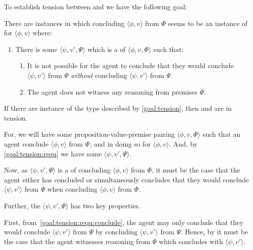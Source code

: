 \begin{note}[Goal]
  To establish tension between \ESU{} and \csN{} we have the following goal:

  \begin{goal}
    \label{goal:tension}
    There are instances in which concluding \(\langle \phi,v \rangle\) from \(\Phi\) seems to be an instance of \csN{} for \(\langle \phi,v \rangle\) where:
    \begin{enumerate}[label=\arabic*., ref=\named{G\ref{goal:tension}:\arabic*}]
    \item
      \label{goal:tension:requ}
      There is some \(\langle \psi,v',\Psi \rangle\) which is a \requ{} of \(\langle \phi,v,\Phi \rangle\) such that:
      \begin{enumerate}[label=\alph*., ref=\named{G\ref{goal:tension}:1\alph*}]
      \item
        \label{goal:tension:requ:conclude}
        It is not possible for the agent to conclude that they would conclude \(\langle \psi,v' \rangle\) from \(\Psi\) \emph{without} concluding \(\langle \psi,v' \rangle\) from \(\Psi\).
      \item
        \label{goal:tension:requ:no-reason}
        The agent does not witness any reasoning from premises \(\Psi\).
      \end{enumerate}
    \end{enumerate}
    \vspace{-\baselineskip}
  \end{goal}

  If there are instance of the type described by \autoref{goal:tension}, then \ESU{} and \csN{} are in tension.

  For, we will have some proposition-value-premise pairing \(\langle \phi,v,\Phi \rangle\) such that an agent conclude \(\langle \phi,v \rangle\) from \(\Phi\), and in doing so \csV{} for \(\langle \phi,v \rangle\).
  And, by \autoref{goal:tension:requ} we have some \requ{} \(\langle \psi,v',\Psi \rangle\).

  Now, as \(\langle \psi,v',\Psi \rangle\) is a  of concluding \(\langle \phi,v \rangle\) from \(\Phi\), it must be the case that the agent either has concluded or simultaneously concludes that they would conclude \(\langle \psi,v' \rangle\) from \(\Psi\) when concluding \(\langle \phi,v \rangle\) from \(\Phi\).

  Further, the \requ{} \(\langle \psi,v',\Psi \rangle\) has two key properties.

  First, from~\autoref{goal:tension:requ:conclude}, the agent may only conclude that they would conclude \(\langle \psi,v' \rangle\) from \(\Psi\) by concluding \(\langle \psi,v' \rangle\) from \(\Psi\).
  Hence, by \ESU{} it must be the case that the agent witnesses reasoning from \(\Psi\) which concludes with \(\langle \psi,v' \rangle\).


\end{note}
